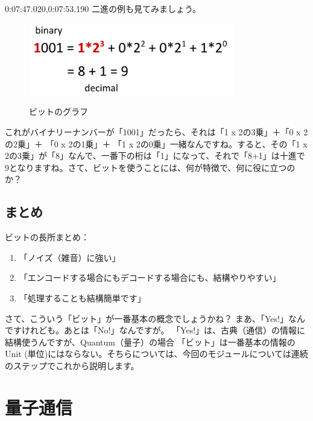0:07:47.020,0:07:53.190
二進の例も見てみましょう。
\begin{figure}[H]
    \centering
    \includegraphics[width=0.8\textwidth]{lesson1/binary_ex.pdf}
    \label{fig: 1}
    \begin{center}
        \caption{ビットのグラフ}
    \end{center}
\end{figure}
これがバイナリーナンバーが「1001」だったら、それは「1 x 2の3乗」＋「0 x 2の2乗」＋ 「0 x 2の1乗」＋ 「1 x 2の0乗」一緒なんですね。すると、その「1 x 2の3乗」が「8」なんで、一番下の桁は「1」になって、それで「8+1」は十進で 9となりますね。さて、ビットを使うことには、何が特徴で、何に役に立つのか？
\subsection{まとめ}
ビットの長所まとめ：
\begin{enumerate}
    \item 「ノイズ（雑音）に強い」
    \item 「エンコードする場合にもデコードする場合にも、結構やりやすい」
    \item 「処理することも結構簡単です」
\end{enumerate}
さて、こういう「ビット」が一番基本の概念でしょうかね？
まあ、「Yes!」なんですけれども。あとは「No!」なんですが。
「Yes!」は、古典（通信）の情報に結構使うんですが、Quantum（量子）の場合
「ビット」は一番基本の情報のUnit (単位)にはならない。そちらについては、今回のモジュールについては連続のステップでこれから説明します。



\section{量子通信}

